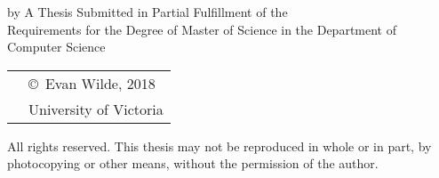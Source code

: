 \pagebreak
{
\centering
\thesistitle
\tpbreak
by
\tpbreak
\nameanddegrees
\tpbreak
A Thesis Submitted in Partial Fulfillment of the \\
Requirements for the Degree of
\tpbreak
Master of Science
\tpbreak
in the Department of Computer Science
\vfill
\begin{tabular}{cl}
& \copyright\ Evan Wilde, 2018\\
& \phantom{\copyright} University of Victoria
\end{tabular}
\tpbreak
All rights reserved. This thesis may not be reproduced in whole or in part, by \\
\hfill photocopying or other means, without the permission of the author.
\hfill
}
\pagebreak
